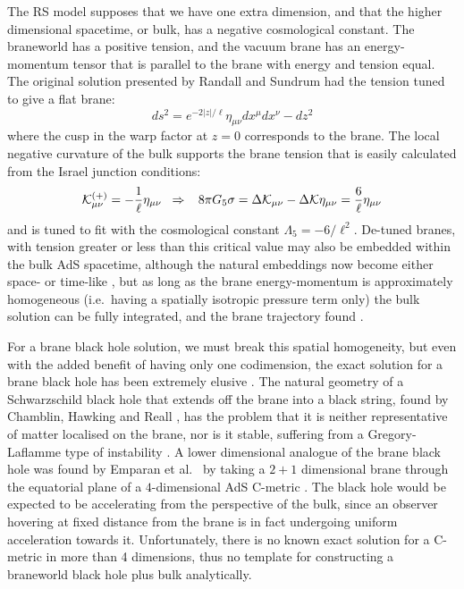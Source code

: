 \documentclass[aps,12pt,prd,superscriptaddress,preprintnumbers, 
	amssymb,
	amsmath,
	notitlepage,
	longbibliography,
	nofootinbib]{revtex4-1}
\newcommand{\be}{\begin{equation}}
\newcommand{\ee}{\end{equation}}
\begin{document}
The RS model supposes that we have one extra 
dimension, and that the higher dimensional spacetime, or bulk,
has a negative cosmological constant. The braneworld has
a positive tension, and the vacuum brane has an energy-momentum
tensor that is parallel to the brane with energy and tension equal.
The original solution presented by Randall and Sundrum had the tension
tuned to give a flat brane:
\be
ds^2 = e^{-2|z|/\ell} \eta_{\mu\nu} dx^\mu dx^\nu - dz^2
\ee
where the cusp in the warp factor at $z=0$ corresponds to the 
brane. The local negative curvature of the bulk supports the brane 
tension that is easily calculated from the Israel junction conditions:
\be
{\cal K}^{(+)}_{\mu\nu} = -\frac1\ell \eta_{\mu\nu} \;\; \Rightarrow\;\;\;
8\pi G_5 \sigma = \Delta {\cal K}_{\mu\nu} -  \Delta {\cal K} \eta_{\mu\nu}
= \frac6\ell \eta_{\mu\nu}
\ee
and is tuned to fit with the cosmological constant $\Lambda_5 = -6/\ell^2$. 
De-tuned branes, with tension greater or less than this critical
value may also be embedded within the bulk AdS spacetime,
although the natural embeddings now become either space- or time-like
\cite{Chamblin:1999ya,Kaloper:1999sm,Kraus:1999it,Binetruy:1999ut,
BCG,Karch:2000gx}, but as long as the brane energy-momentum 
is approximately homogeneous (i.e.\ having a spatially isotropic
pressure term only) the bulk solution can be fully integrated, and
the brane trajectory found \cite{BCG}.

For a brane black hole solution, we must break this spatial homogeneity,
but even with the added benefit of having only one codimension, the
exact solution for a brane black hole has been extremely elusive
\cite{Gregory:2008rf,Kanti:2009sz}.
The natural geometry of a Schwarzschild black hole that
extends off the brane into a black string, found by Chamblin,
Hawking and Reall \cite{Chamblin:1999by},
has the problem that it is neither representative of matter
localised on the brane, nor is it stable, suffering from a Gregory-Laflamme type 
of instability \cite{Gregory:1993vy,Gregory:2000gf}. A lower dimensional
analogue of the brane black hole was found by Emparan et al.\
\cite{Emparan:1999wa,Emparan:1999fd} by taking a $2+1$ dimensional
brane through the equatorial plane of a $4$-dimensional AdS C-metric
\cite{Kinnersley:1970zw,Plebanski:1976gy}.
The black hole would be expected to be accelerating from the perspective
of the bulk, since an observer hovering at fixed distance from the brane
is in fact undergoing uniform acceleration towards it. Unfortunately,
there is no known exact solution for a C-metric in more than 4 dimensions,
thus no template for constructing a braneworld black hole plus bulk analytically.
\end{document}
